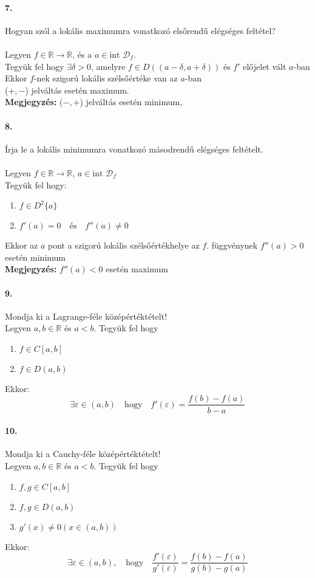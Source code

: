 \documentclass[10pt,a4paper]{article}
\newcommand{\R}{\mathbb{R}}
\newcommand{\D}{\mathcal{D}}
\newcommand{\fR}{f\in\R\rightarrow\R}
\renewcommand{\>}{\rightarrow}
\begin{document}
\paragraph{7.}
Hogyan szól a lokális maximumra vonatkozó elsőrendű elégséges feltétel? \\\\
Legyen $\fR$, és a $a\in \text{int }\D_f$.\\
Tegyük fel hogy $\exists \delta >0$, amelyre $f\in D((a-\delta ,a+\delta )) $ és $f'$ előjelet vált $a$-ban \\
Ekkor $f$-nek szigorú lokális szélsőértéke van az $a$-ban \\
($+,-$) jelváltás esetén maximum. \\
\textbf{Megjegyzés:} ($-,+$) jelváltás esetén minimum,
\paragraph{8.}
Írja le a lokális minimumra vonatkozó másodrendű elégséges feltételt. \\\\
Legyen $f \in \R \rightarrow \R$, $a\in \text{int } \D_f$\\
Tegyük fel hogy:
\begin{enumerate}
\item $f\in D^2\{a\}$
\item $f'(a)=0 \quad \text{és} \quad f''(a)\neq 0$  
\end{enumerate}
Ekkor az $a$ pont a szigorú lokális szélsőértékhelye az $f$. függvénynek $f''(a)>0$ esetén minimum \\
\textbf{Megjegyzés:} $f''(a)<0 $ esetén maximum
\paragraph{9.}
Mondja ki a Lagrange-féle középértéktételt! \\
Legyen $a,b\in\R$ és $a<b$. Tegyük fel hogy 
\begin{enumerate}
\item $f\in C [a,b]$
\item $f\in D(a,b)$
\end{enumerate}
Ekkor:
\[
\exists \varepsilon \in (a,b) \quad \text{hogy} \quad f'(\varepsilon) = \frac{f(b)-f(a)}{b-a}
\]
\paragraph{10.}
Mondja ki a Cauchy-féle középértéktételt! \\
Legyen $a,b\in\R$ és $a<b$. Tegyük fel hogy 
\begin{enumerate}
\item $f,g\in C[a,b]$
\item $f,g\in D(a,b)$
\item $g'(x)\neq 0 (x\in (a,b))$
\end{enumerate}
Ekkor:
\[
\exists \varepsilon \in (a,b), \quad \text{hogy} \quad \frac{f'(\varepsilon)}{g'(\varepsilon)} = \frac{f(b)-f(a)}{g(b)-g(a)}
\]
\newpage
\end{document}
